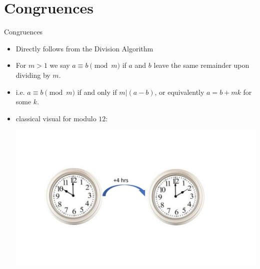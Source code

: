\documentclass[ %
 usenames,dvipsnames,
aspectratio=169,11pt ]{beamer}
\newenvironment{stepitemize}{\begin{itemize}[<+->]}{\end{itemize} }
\begin{document}
\section{Congruences}
\begin{frame}{Congruences}
\begin{stepitemize}
\item Directly follows from the Division Algorithm
\item For $m>1$ we say $a\equiv b \pmod{m}$ if $a$ and $b$ leave the same remainder upon dividing by $m$.
\item i.e. $a\equiv b \pmod{m}$ if and only if $m|(a-b)$, or equivalently $a=b+mk$ for some $k$.
\item classical visual for modulo $12$:
    \begin{center}
    \includegraphics[scale=.35]{clock1.pdf}
\end{center}

\end{stepitemize}
\end{frame}
\end{document}
